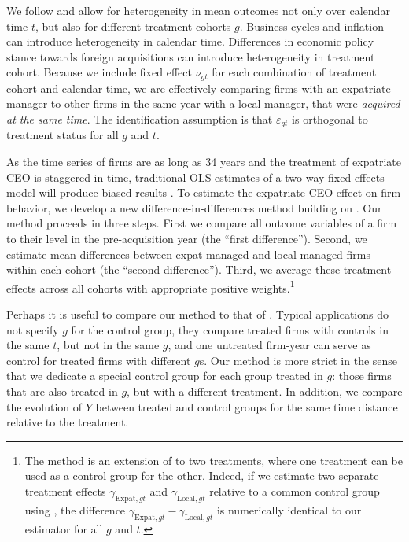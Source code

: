 \documentclass[12pt,a4paper]{article}
\begin{document}
We follow \cite{callaway2021difference} and allow for heterogeneity in mean outcomes not only over calendar time $t$, but also for different treatment cohorts $g$. Business cycles and inflation can introduce heterogeneity in calendar time. Differences in economic policy stance towards foreign acquisitions can introduce heterogeneity in treatment cohort. Because we include fixed effect $\nu_{gt}$ for each combination of treatment cohort and calendar time, we are effectively comparing firms with an expatriate manager to other firms in the same year with a local manager, that were \emph{acquired at the same time}. The identification assumption is that $\varepsilon_{gt}$ is orthogonal to treatment status for all $g$ and $t$.

As the time series of firms are as long as 34 years and the treatment of expatriate CEO is staggered in time, traditional OLS estimates of a two-way fixed effects model will produce biased results \citep{de2020two}. To estimate the expatriate CEO effect on firm behavior, we develop a new difference-in-differences method building on \cite{callaway2021difference}. Our method proceeds in three steps. First we compare all outcome variables of a firm to their level in the pre-acquisition year (the ``first difference''). Second, we estimate mean differences between expat-managed and local-managed firms within each cohort (the ``second difference''). Third, we average these treatment effects across all cohorts with appropriate positive weights.\footnote{The method is an extension of \cite{callaway2021difference} to two treatments, where one treatment can be used as a control group for the other. Indeed, if we estimate two separate treatment effects $\gamma_{\text{Expat},gt}$ and $\gamma_{\text{Local},gt}$ relative to a common control group using \cite{callaway2021difference}, the difference $\gamma_{\text{Expat},gt}-\gamma_{\text{Local},gt}$ is numerically identical to our estimator for all $g$ and $t$.}

Perhaps it is useful to compare our method to that of \cite{callaway2021difference}. Typical applications do not specify $g$ for the control group, they compare treated firms with controls in the same $t$, but not in the same $g$, and one untreated firm-year can serve as control for treated firms with different $g$s. Our method is more strict in the sense that we dedicate a special control group for each group treated in $g$: those firms that are also treated in $g$, but with a different treatment. In addition, we compare the evolution of $Y$ between treated and control groups for the same time distance relative to the treatment.
\end{document}

